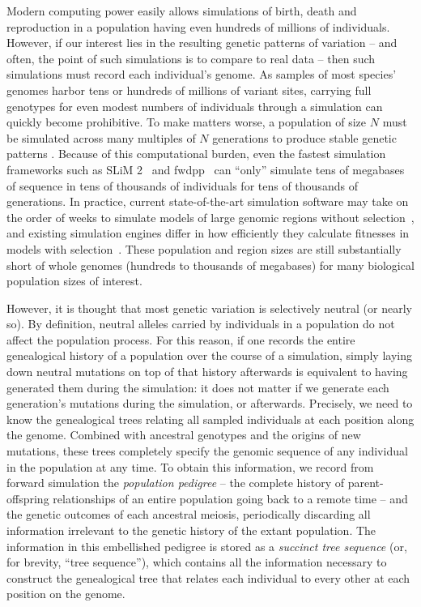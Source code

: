 \documentclass{article}
\begin{document}
Modern computing power easily allows simulations of birth, death and reproduction
in a population having even hundreds of millions of individuals.
However, if our interest lies in the resulting genetic patterns of variation
-- and often, the point of such simulations is to compare to real data --
then such simulations must record each individual's genome.
As samples of most species' genomes harbor tens or hundreds of millions of variant sites,
carrying full genotypes for even modest numbers of individuals through a simulation
can quickly become prohibitive.
To make matters worse,
a population of size $N$ must be simulated across many multiples of $N$ generations
to produce stable genetic patterns \citep{wright1931evolution, wakeley2005coalescent}.
Because of this computational burden, even the fastest simulation frameworks such as
SLiM 2~\citep{haller2017flexible} and fwdpp~\citep{fwdpp}
can ``only'' simulate tens of megabases of sequence in tens of thousands of individuals
for tens of thousands of generations.
In practice, current state-of-the-art simulation software may take on the order of
weeks to simulate models of large genomic regions without selection~\citep{fwdpp,Hernandez2015-wf},
and existing simulation engines differ in how efficiently they
calculate fitnesses in models with selection~\citep{fwdpp}.
These population and region sizes are still substantially short of whole genomes
(hundreds to thousands of megabases)
for many biological population sizes of interest.

However, it is thought that most genetic variation is selectively neutral (or nearly so).
By definition, neutral alleles carried by individuals in a population
do not affect the population process.
For this reason, if one records the entire genealogical history of a population over the course of a simulation,
simply laying down neutral mutations on top of that history afterwards
is equivalent to having generated them during the simulation:
it does not matter if we generate each generation's mutations during the simulation, or afterwards.
Precisely, we need to know the genealogical trees relating all sampled individuals
at each position along the genome.
Combined with ancestral genotypes and the origins of new mutations,
these trees completely specify the genomic sequence of any individual in the population at any time.
To obtain this information, we record from forward simulation the \emph{population pedigree} --
the complete history of parent-offspring relationships of an entire population
going back to a remote time -- and the genetic outcomes of each ancestral meiosis,
periodically discarding all information irrelevant to the genetic history
of the extant population.
The information in this embellished pedigree is stored as a \emph{succinct tree sequence}
(or, for brevity, ``tree sequence''),
which contains all the information necessary
to construct the genealogical tree that relates each individual to every other
at each position on the genome.
\end{document}
